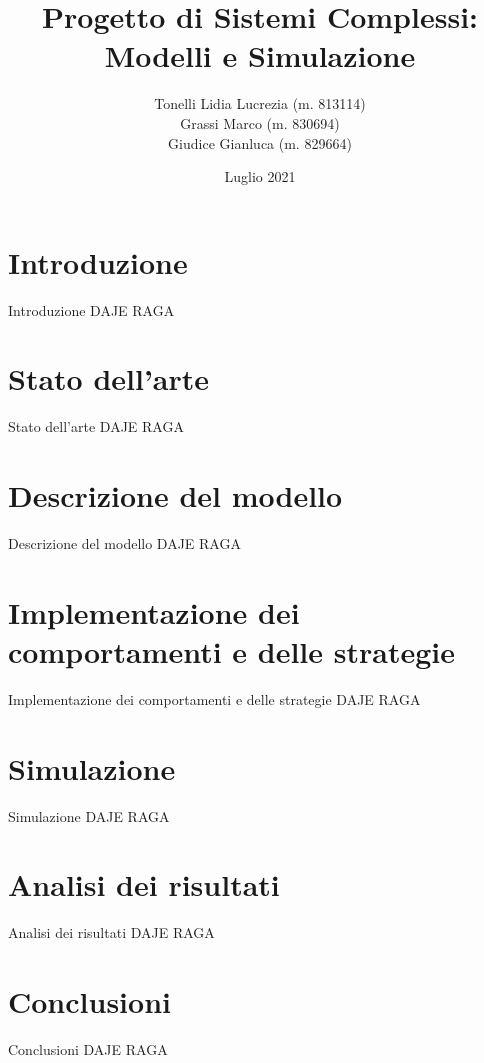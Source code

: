 \documentclass[11pt]{beamer}
\author{Tonelli Lidia Lucrezia (m. 813114) \\ Grassi Marco (m. 830694) \\ Giudice Gianluca (m. 829664)}
\title{Progetto di Sistemi Complessi: Modelli e Simulazione}
\institute[University of Milano Bicocca] 
{
University of Milano Bicocca \\ 
\medskip
}
\date{Luglio 2021}
\begin{document}
\begin{frame}
\titlepage
\end{frame}

\begin{frame}
\tableofcontents
\end{frame}

\section{Introduzione}
\begin{frame}{Introduzione}
\centering
DAJE RAGA
\end{frame}

\section{Stato dell'arte}
\begin{frame}{Stato dell'arte}
\centering
DAJE RAGA
\end{frame}

\section{Descrizione del modello}
\begin{frame}{Descrizione del modello}
\centering
DAJE RAGA
\end{frame}

\section{Implementazione dei comportamenti e delle strategie}
\begin{frame}{Implementazione dei comportamenti e delle strategie}
\centering
DAJE RAGA
\end{frame}

\section{Simulazione}
\begin{frame}{Simulazione}
\centering
DAJE RAGA
\end{frame}

\section{Analisi dei risultati}
\begin{frame}{Analisi dei risultati}
\centering
DAJE RAGA
\end{frame}

\section{Conclusioni}
\begin{frame}{Conclusioni}
\centering
DAJE RAGA
\end{frame}
\end{document}
